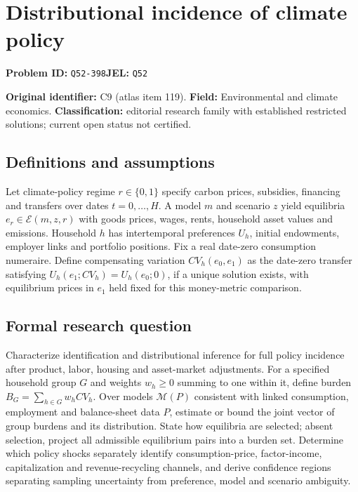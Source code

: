 \documentclass[11pt,a4paper]{article}
\begin{document}
\section*{Distributional incidence of climate policy}
\textbf{Problem ID:} \texttt{Q52-398}\quad \textbf{JEL:} \texttt{Q52}\par
\label{problem:OP-0119}
\label{atlas:prob:C9}

\noindent\textbf{Original identifier:} C9 (atlas item 119). \textbf{Field:} Environmental and climate economics. \textbf{Classification:} editorial research family with established restricted solutions; current open status not certified.

\subsection*{Definitions and assumptions}

Let climate-policy regime $r\in\{0,1\}$ specify carbon prices, subsidies, financing and transfers over dates $t=0,\ldots,H$. A model $m$ and scenario $z$ yield equilibria $e_r\in\mathcal E(m,z,r)$ with goods prices, wages, rents, household asset values and emissions. Household $h$ has intertemporal preferences $U_h$, initial endowments, employer links and portfolio positions. Fix a real date-zero consumption numeraire. Define compensating variation $CV_h(e_0,e_1)$ as the date-zero transfer satisfying $U_h(e_1;CV_h)=U_h(e_0;0)$, if a unique solution exists, with equilibrium prices in $e_1$ held fixed for this money-metric comparison.

\subsection*{Formal research question}

Characterize identification and distributional inference for full policy incidence after product, labor, housing and asset-market adjustments. For a specified household group $G$ and weights $w_h\ge0$ summing to one within it, define burden $B_G=\sum_{h\in G}w_hCV_h$. Over models $\mathcal M(P)$ consistent with linked consumption, employment and balance-sheet data $P$, estimate or bound the joint vector of group burdens and its distribution. State how equilibria are selected; absent selection, project all admissible equilibrium pairs into a burden set. Determine which policy shocks separately identify consumption-price, factor-income, capitalization and revenue-recycling channels, and derive confidence regions separating sampling uncertainty from preference, model and scenario ambiguity.
\end{document}

